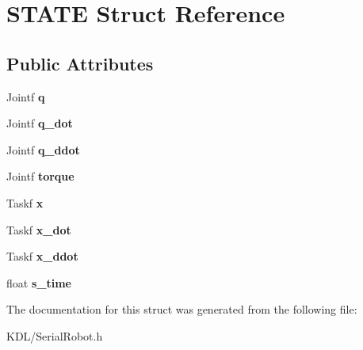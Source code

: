\hypertarget{struct_s_t_a_t_e}{}\section{S\+T\+A\+TE Struct Reference}
\label{struct_s_t_a_t_e}
\subsection*{Public Attributes}
\begin{DoxyCompactItemize}
\item 
\mbox{\label{struct_s_t_a_t_e_aaf1acf3e9aa45d1f32337af944af26d7}} 
Jointf {\bfseries q}
\item 
\mbox{\label{struct_s_t_a_t_e_af2929b0981e3b4f9bc4c267c1ddbc8eb}} 
Jointf {\bfseries q\+\_\+dot}
\item 
\mbox{\label{struct_s_t_a_t_e_a5cdf6591671f6d504b475bd5058fed7f}} 
Jointf {\bfseries q\+\_\+ddot}
\item 
\mbox{\label{struct_s_t_a_t_e_a02d67c9a720ed33c9c687635c4898844}} 
Jointf {\bfseries torque}
\item 
\mbox{\label{struct_s_t_a_t_e_a820ac7c4d6e93b3dbc88d0d35e08eb7a}} 
Taskf {\bfseries x}
\item 
\mbox{\label{struct_s_t_a_t_e_a47d8aa2e9bca7bb01a140f94c68072e2}} 
Taskf {\bfseries x\+\_\+dot}
\item 
\mbox{\label{struct_s_t_a_t_e_ac4d9befbe4fd6d2eb24c2890fb594638}} 
Taskf {\bfseries x\+\_\+ddot}
\item 
\mbox{\label{struct_s_t_a_t_e_afa8e6b0f5314340e6654a8419c6c6e84}} 
float {\bfseries s\+\_\+time}
\end{DoxyCompactItemize}


The documentation for this struct was generated from the following file\+:\begin{DoxyCompactItemize}
\item 
K\+D\+L/Serial\+Robot.\+h\end{DoxyCompactItemize}
